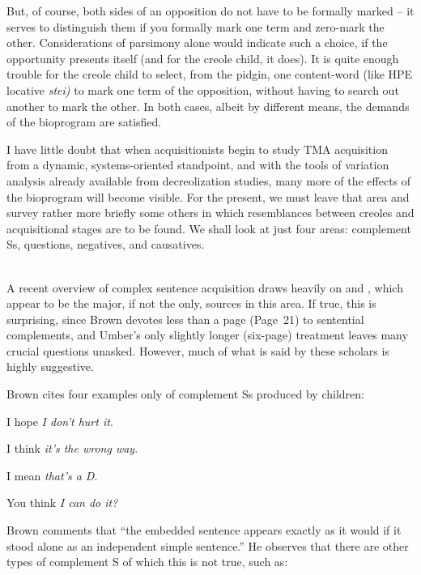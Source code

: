 But, of course, both sides of an opposition do not have to be formally marked -- it serves to distinguish them if you formally mark one term and zero-mark the other. Considerations of parsimony alone would indicate such a choice, if the opportunity presents itself (and for the creole child, it does). It is quite enough trouble for the creole child to select, from the pidgin, one content-word (like HPE locative \textit{stei)} to mark one term of the opposition, without having to search out another to mark the other. In both cases, albeit by different means, the demands of the bioprogram are satisfied.

I have little doubt that when acquisitionists begin to study TMA acquisition from a dynamic, systems-oriented standpoint, and with the tools of variation analysis already available from decreolization studies, many more of the effects of the bioprogram will become visible. For the present, we must leave that area and survey rather more briefly some others in which resemblances between creoles and acquisitional stages are to be found. We shall look at just four areas: complement Ss, questions, negatives, and causatives.\\\\

A recent overview of complex sentence acquisition \citep{Bowerman1979} draws heavily on \citet{Brown1973} and \citet{Limber1973}, which appear to be the major, if not the only, sources in this area. If true, this is surprising, since Brown devotes less than a page (Page~21) to sentential complements, and Umber's only slightly longer (six-page) treatment leaves many crucial questions unasked. However, much of what is said by these scholars is highly suggestive.

Brown cites four examples only of complement Ss produced by children:

\ea\label{ex:3:24}
 I hope \textit{I don't hurt it}.
\z

\ea\label{ex:3:25}
 I think \textit{it's the wrong way}.
\z

\ea\label{ex:3:26}
 I mean \textit{that's a D}.
\z

\ea\label{ex:3:27}
 You think \textit{I can do it?}
\z

\noindent Brown comments that ``the embedded sentence appears exactly as it would if it stood alone as an independent simple sentence.'' He observes that there are other types of complement S of which this is not true, such as:

